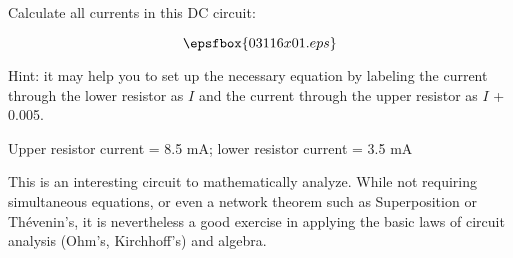 

Calculate all currents in this DC circuit:

$$\epsfbox{03116x01.eps}$$

Hint: it may help you to set up the necessary equation by labeling the current through the lower resistor as $I$ and the current through the upper resistor as $I$ + 0.005.







Upper resistor current = 8.5 mA; lower resistor current = 3.5 mA







This is an interesting circuit to mathematically analyze.  While not requiring simultaneous equations, or even a network theorem such as Superposition or Th\'evenin's, it is nevertheless a good exercise in applying the basic laws of circuit analysis (Ohm's, Kirchhoff's) and algebra.




